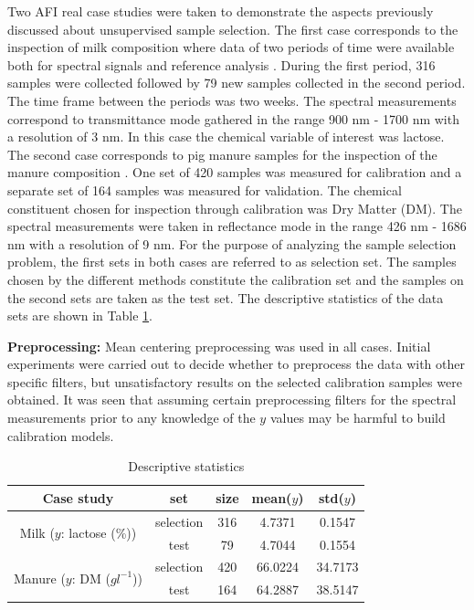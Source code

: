 \documentclass[journal=ancham,manuscript=article]{achemso}
\begin{document}
Two AFI real case studies were taken to demonstrate the aspects previously discussed about unsupervised sample selection. The first case corresponds to the inspection of milk composition where data of two periods of time were available both for spectral signals and reference analysis \cite{Diaz-Olivares2020}. During the first period, 316 samples were collected followed by 79 new samples collected in the second period. The time frame between the periods was two weeks. The spectral measurements correspond to transmittance mode gathered in the range 900 nm - 1700 nm with a resolution of 3 nm. In this case the chemical variable of interest was lactose. 
The second case corresponds to pig manure samples for the inspection of the manure composition \cite{Saeys2005}. One set of 420 samples was measured for calibration and a separate set of 164 samples was measured for validation. The chemical constituent chosen for inspection through calibration was Dry Matter (DM). The spectral measurements were taken in reflectance mode in the range 426 nm - 1686 nm with a resolution of 9 nm.
For the purpose of analyzing the sample selection problem, the first sets in both cases are referred to as selection set. The samples chosen by the different methods constitute the calibration set and the samples on the second sets are taken as the test set. The descriptive statistics of the data sets are shown in Table \ref{tab_descriptive_statistics}.

\textbf{Preprocessing:} Mean centering preprocessing was used in all cases. Initial experiments were carried out to decide whether to preprocess the data with other specific filters, but unsatisfactory results on the selected calibration samples were obtained. It was seen that assuming certain preprocessing filters for the spectral measurements prior to any knowledge of the $y$ values may be harmful to build calibration models. 

\begin{table}[t]
\centering
\begin{tabular}{|c|c|c|c|c|} 
\hline
Case study	& set & size & mean($y$) & std($y$)  	\\
\hline
\multirow{2}{10em}{Milk ($y$: lactose (\%))} & selection & 316 & 4.7371 & 0.1547\\
& test & 79 & 4.7044 & 0.1554\\
\hline
\multirow{2}{10em}{Manure ($y$: DM ($gl^{-1}$))} & selection & 420 & 66.0224 & 34.7173\\
& test & 164 & 64.2887 & 38.5147 \\
\hline 


\end{tabular}
\caption{Descriptive statistics}
\label{tab_descriptive_statistics}
\end{table}
\end{document}

